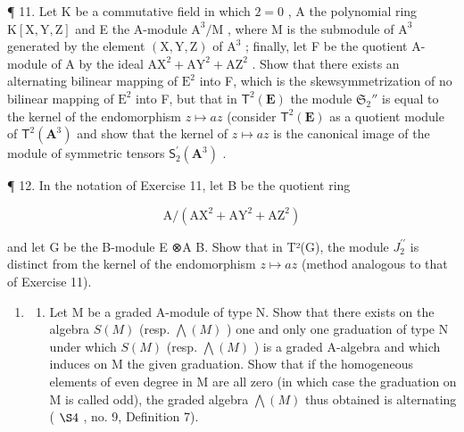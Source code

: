 ¶ 11. Let K be a commutative field in which \(2 = 0\) , A the polynomial ring \(\mathrm{K}[\mathrm{X}, \mathrm{Y}, \mathrm{Z}]\) and E the A-module \(\mathrm{A}^3/\mathrm{M}\) , where M is the submodule of \(\mathrm{A}^3\) generated by the element \((\mathrm{X}, \mathrm{Y}, \mathrm{Z})\) of \(\mathrm{A}^3\) ; finally, let F be the quotient A-module of A by the ideal \(\mathrm{AX}^2 + \mathrm{AY}^2 + \mathrm{AZ}^2\) . Show that there exists an alternating bilinear mapping of \(\mathrm{E}^2\) into F, which is the skewsymmetrization of no bilinear mapping of \(\mathrm{E}^2\) into F, but that in \(\mathsf{T}^2(\mathbf{E})\) the module \(\mathfrak{S}_2''\) is equal to the kernel of the endomorphism \(z \mapsto az\) (consider \(\mathsf{T}^2(\mathbf{E})\) as a quotient module of \(\mathsf{T}^2 (\mathbf{A}^3)\) and show that the kernel of \(z\mapsto az\) is the canonical image of the module of symmetric tensors \(\mathsf{S}_2^{\prime}(\mathbf{A}^3)\) .

¶ 12. In the notation of Exercise 11, let B be the quotient ring

\[
\mathrm{A} / (\mathrm{AX} ^ {2} + \mathrm{AY} ^ {2} + \mathrm{AZ} ^ {2})
\]

and let G be the B-module E ⊗A B. Show that in T²(G), the module \(J_{2}^{\prime\prime}\) is distinct from the kernel of the endomorphism \(z \mapsto az\) (method analogous to that of Exercise 11).

\begin{enumerate}
\def\labelenumi{\arabic{enumi}.}
\setcounter{enumi}{12}
\tightlist
\item
  \begin{enumerate}
  \def\labelenumii{(\alph{enumii})}
  \tightlist
  \item
    Let M be a graded A-module of type N. Show that there exists on the algebra \(S(M)\) (resp. \(\bigwedge(M)\) ) one and only one graduation of type N under which \(S(M)\) (resp. \(\bigwedge(M)\) ) is a graded A-algebra and which induces on M the given graduation. Show that if the homogeneous elements of even degree in M are all zero (in which case the graduation on M is called odd), the graded algebra \(\bigwedge(M)\) thus obtained is alternating ( \(\S 4\) , no. 9, Definition 7).
  \end{enumerate}
\end{enumerate}

